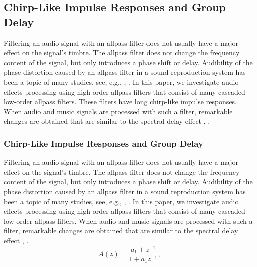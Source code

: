 \documentclass{aes2e}
\begin{document}
\subsection{Chirp-Like Impulse Responses and Group Delay}
Filtering an audio signal with an allpass filter does not usually have a major effect on the signal's timbre. The allpass filter does not change the frequency content of the signal, but only introduces a phase shift or delay. Audibility of the phase distortion caused by an allpass filter in a sound reproduction system has been a topic of many studies, see, e.g., \cite{DEK1}, \cite{DEK2}. In this paper, we investigate audio effects processing using high-order allpass filters that consist of many cascaded low-order allpass filters. These filters have long chirp-like impulse responses. When audio and music signals are processed with such a filter, remarkable changes are obtained that are similar to the spectral delay effect  \cite{DEK3}, \cite{DEK4}.

\subsubsection{Chirp-Like Impulse Responses and Group Delay}
Filtering an audio signal with an allpass filter does not usually have a major effect on the signal's timbre. The allpass filter does not change the frequency content of the signal, but only introduces a phase shift or delay. Audibility of the phase distortion caused by an allpass filter in a sound reproduction system has been a topic of many studies, see, e.g., \cite{DEK1}, \cite{DEK2}. In this paper, we investigate audio effects processing using high-order allpass filters that consist of many cascaded low-order allpass filters.  When audio and music signals are processed with such a filter, remarkable changes are obtained that are similar to the spectral delay effect  \cite{DEK3}, \cite{DEK4}.
\begin{equation}
A(z) = \frac{{a_1  + z^{ - 1} }}{{1 + a_1 z^{ - 1} }},
\end{equation}
\end{document}
